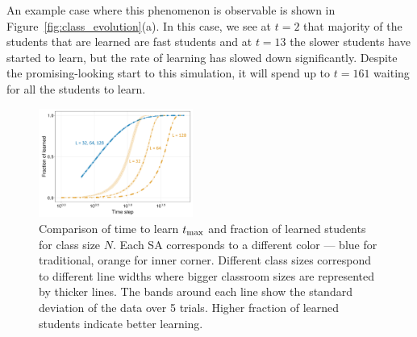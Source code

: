 \documentclass[twocolumn,secnumarabic,amssymb, nobibnotes, aps, prd]{revtex4-2}
\begin{document}
        An example case where this phenomenon is observable is shown in Figure~\ref{fig:class_evolution}(a).
        In this case, we see at $t=2$ that majority of the students that are learned are fast students and at $t=13$ the slower students have started to learn, but the rate of learning has slowed down significantly.
        Despite the promising-looking start to this simulation, it will spend up to $t=161$ waiting for all the students to learn.


        \begin{figure}[htbp!]
            \centering
            \includegraphics[width=0.45\textwidth]{figures/2D-BPCAIH-analysis/comparison plots/size.png}
            \caption{Comparison of time to learn $t_{\rm max}$ and fraction of learned students for class size $N$.
            Each SA corresponds to a different color --- blue for traditional, orange for inner corner.
            Different class sizes correspond to different line widths where bigger classroom sizes are represented by thicker lines.
            The bands around each line show the standard deviation of the data over 5 trials.
            Higher fraction of learned students indicate better learning.}
            \label{fig:comparison size}
        \end{figure}

\end{document}
